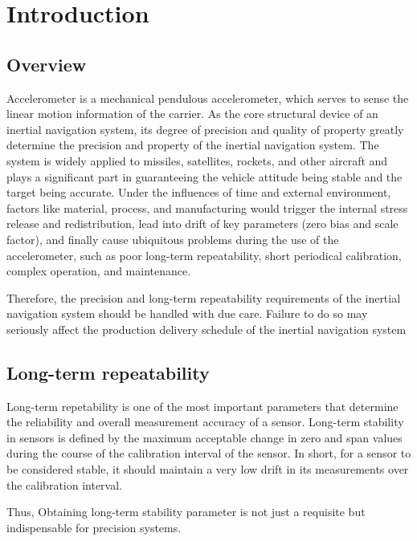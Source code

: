 \documentclass{FR16}
\begin{document}
\maketitle

\tableofcontents
\newpage

\section{Introduction}

\subsection{Overview}
Accelerometer is a mechanical pendulous accelerometer, which serves to sense the linear motion information of the carrier. As the core structural device of an inertial navigation system, its degree of precision and quality of property greatly determine the precision and property of the inertial navigation system. The system is widely applied to missiles, satellites, rockets, and other aircraft and plays a significant part in guaranteeing the vehicle attitude being stable and the target being accurate.
Under the influences of time and external environment, factors like material, process, and manufacturing would trigger the internal stress release and redistribution, lead into drift of
key parameters (zero bias and scale factor), and finally cause
ubiquitous problems during the use of the accelerometer, such
as poor long-term repeatability, short periodical calibration,
complex operation, and maintenance.

Therefore, the precision and long-term repeatability requirements of the inertial navigation system should be handled with due care. Failure to do so may seriously affect  the production delivery schedule of the inertial navigation system

\subsection{Long-term repeatability}
Long-term repetability is  one of the most important parameters that determine the reliability and overall measurement accuracy of a  sensor. Long-term stability in sensors is defined by the maximum acceptable change in zero and span values during the course of the calibration interval of the sensor. In short, for a sensor to be considered stable, it should maintain a very low drift in its measurements over the calibration interval.

Thus, Obtaining long-term stability parameter is not just a requisite but indispensable for precision systems. 
\end{document}
